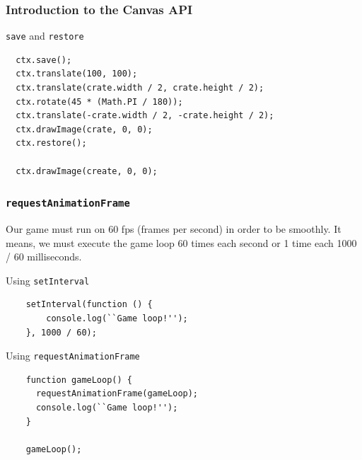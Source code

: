 \begin{frame}[fragile]
  \frametitle{Introduction to the Canvas API}

  \begin{block}{\texttt{save} and \texttt{restore}}
  {\tiny
  \begin{verbatim}
  ctx.save();
  ctx.translate(100, 100);
  ctx.translate(crate.width / 2, crate.height / 2);
  ctx.rotate(45 * (Math.PI / 180));
  ctx.translate(-crate.width / 2, -crate.height / 2);
  ctx.drawImage(crate, 0, 0);
  ctx.restore();

  ctx.drawImage(create, 0, 0);
  \end{verbatim}
  }
  \end{block}
\end{frame}

\begin{frame}[fragile]
  \frametitle{\texttt{requestAnimationFrame}}

  Our game must run on 60 fps (frames per second) in order to be smoothly. It means, we must execute the game loop 60 times each second or 1 time each 1000 / 60 milliseconds.

  \pause

  \begin{block}{Using \texttt{setInterval}}
  {\scriptsize
  \begin{verbatim}
    setInterval(function () {
        console.log(``Game loop!'');
    }, 1000 / 60);
  \end{verbatim}
  }
  \end{block}

  \pause

  \begin{block}{Using \texttt{requestAnimationFrame}}
  {\scriptsize
  \begin{verbatim}
    function gameLoop() {
      requestAnimationFrame(gameLoop);
      console.log(``Game loop!'');
    }

    gameLoop();
  \end{verbatim}
  }
  \end{block}
\end{frame}
